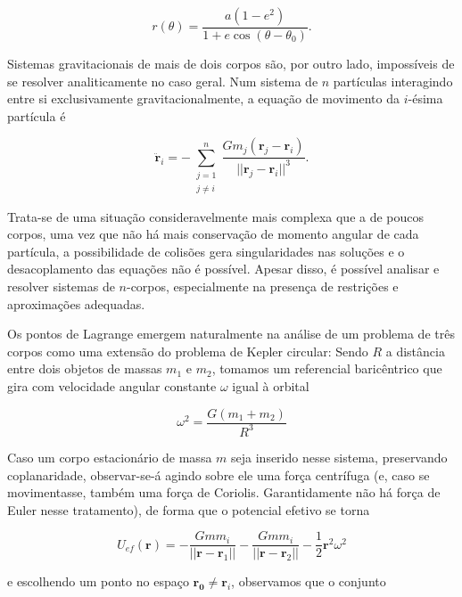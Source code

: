 \begin{equation}
    r(\theta) = \frac{a(1 - e^2)}{1 + e\cos (\theta - \theta_0)}.
\end{equation}

Sistemas gravitacionais de mais de dois corpos são, por outro lado, impossíveis de se resolver analiticamente no caso geral. Num sistema de $n$ partículas interagindo entre si exclusivamente gravitacionalmente, a equação de movimento da $i$-ésima partícula é 

\begin{equation}
    \ddot{\mathbf{r}}_i=-\sum_{\substack{j=1\\j \neq i}}^{n} \frac{Gm_j(\mathbf{r}_j - \mathbf{r}_i)}{||\mathbf{r}_j - \mathbf{r}_i||^3}.
\end{equation} 

Trata-se de uma situação consideravelmente mais complexa que a de poucos corpos, uma vez que não há mais conservação de momento angular de cada partícula, a possibilidade de colisões gera singularidades nas soluções e o desacoplamento das equações não é possível. Apesar disso, é possível analisar e resolver sistemas de $n$-corpos, especialmente na presença de restrições e aproximações adequadas.

Os pontos de Lagrange emergem naturalmente na análise de um problema de três corpos como uma extensão do problema de Kepler circular: Sendo $R$ a distância entre dois objetos de massas $m_1$ e $m_2$, tomamos um referencial baricêntrico que gira com velocidade angular constante $\omega$ igual à orbital

\begin{equation}
    \omega^2 = \frac{G(m_1 + m_2)}{R^3}
\end{equation}

Caso um corpo estacionário de massa $m$ seja inserido nesse sistema, preservando coplanaridade, observar-se-á agindo sobre ele uma força centrífuga (e, caso se movimentasse, também uma força de Coriolis. Garantidamente não há força de Euler nesse tratamento), de forma que o potencial efetivo se torna

\begin{equation}
    U_{ef}(\mathbf{r}) = - \frac{Gmm_i}{||\mathbf{r} - \mathbf{r}_1||} - \frac{Gmm_i}{||\mathbf{r} - \mathbf{r}_2||} - \frac{1}{2}\mathbf{r}^2\omega^2
\end{equation}

e escolhendo um ponto no espaço $\mathbf{r_0} \neq \mathbf{r}_i$, observamos que o conjunto

